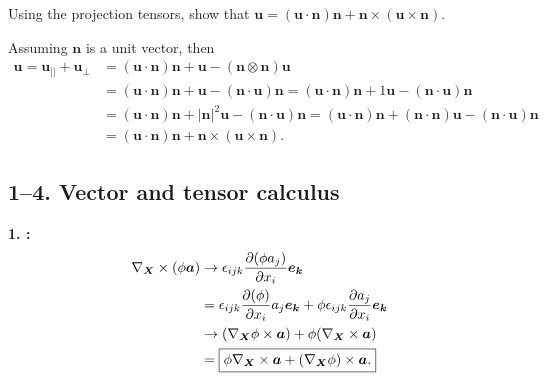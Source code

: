 Using the projection tensors, show that $\bm{u} = (\bm{u} \cdot \bm{n}) \bm{n} + \bm{n} \times (\bm{u} \times \bm{n} )$.

Assuming $\bm{n}$ is a unit vector, then
\begin{align*}
    \bm{u} = \bm{u}_{||} + \bm{u}_{\perp} &= (\bm{u} \cdot \bm{n} ) \bm{n} + \bm{u} - ( \bm{n} \otimes \bm{n} ) \bm{u}\\
    &= (\bm{u} \cdot \bm{n} ) \bm{n} + \bm{u} - (\bm{n} \cdot \bm{u}) \bm{n} = (\bm{u} \cdot \bm{n} ) \bm{n} + 1 \bm{u} - (\bm{n} \cdot \bm{u}) \bm{n}\\
    &= (\bm{u} \cdot \bm{n} ) \bm{n} + |\bm{n}|^2 \bm{u} - (\bm{n} \cdot \bm{u}) \bm{n} =  (\bm{u} \cdot \bm{n} ) \bm{n} + (\bm{n} \cdot \bm{n}) \bm{u} - (\bm{n} \cdot \bm{u}) \bm{n}\\
    &= \boxed{(\bm{u} \cdot \bm{n} ) \bm{n} + \bm{n} \times (\bm{u} \times \bm{n}).}
\end{align*}

\newpage
\subsection*{1--4. \textbf{Vector and tensor calculus}}

\textbf{1. :}
\begin{align*}
    \nabla_{\bm{X}} \times (\phi \bm{a}) &\rightarrow \epsilon_{ijk} \frac{\partial (\phi a_j)}{\partial x_i} \bm{e_k}\\
    &=  \epsilon_{ijk} \frac{\partial (\phi)}{\partial x_i} a_j \bm{e_k} + \phi \epsilon_{ijk} \frac{\partial a_j}{\partial x_i} \bm{e_k}\\
    &\rightarrow (\nabla_{\bm{X}} \phi \times \bm{a}) + \phi (\nabla_{\bm{X}} \times \bm{a})\\
    & = \boxed{\phi \nabla_{\bm{X}} \times \bm{a} + (\nabla_{\bm{X}}\phi) \times \bm{a}.}
\end{align*}

